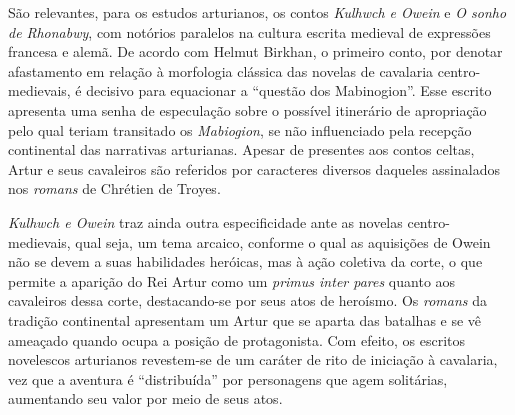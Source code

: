  São relevantes, para os estudos arturianos, os contos \textit{Kulhwch e
Owein} e \textit{O sonho de Rhonabwy}, com notórios paralelos na
cultura escrita medieval de expressões francesa e alemã. De acordo com
Helmut Birkhan, o primeiro conto, por denotar afastamento em relação à
morfologia clássica das novelas de cavalaria centro-medievais, é
decisivo para equacionar a “questão dos Mabinogion”. Esse escrito
apresenta uma senha de especulação sobre o possível itinerário de
apropriação pelo qual teriam transitado os \textit{Mabiogion}, se não
influenciado pela recepção continental das narrativas arturianas.
Apesar de presentes aos contos celtas, Artur e seus cavaleiros são
referidos por caracteres diversos daqueles assinalados nos
\textit{romans} de Chrétien de Troyes.

\textit{Kulhwch e Owein} traz ainda outra especificidade ante as novelas
centro-medievais, qual seja, um tema arcaico, conforme o qual as
aquisições de Owein não se devem a suas habilidades heróicas, mas à
ação coletiva da corte, o que permite a aparição do Rei Artur como um
\textit{primus inter pares} quanto aos cavaleiros dessa corte,
destacando-se por seus atos de heroísmo. Os \textit{romans} da tradição
continental apresentam um Artur que se aparta das batalhas e se vê
ameaçado quando ocupa a posição de protagonista. Com efeito, os
escritos novelescos arturianos revestem-se de um caráter de rito de
iniciação à cavalaria, vez que a aventura é “distribuída” por
personagens que agem solitárias, aumentando seu valor por meio de seus
atos. 

